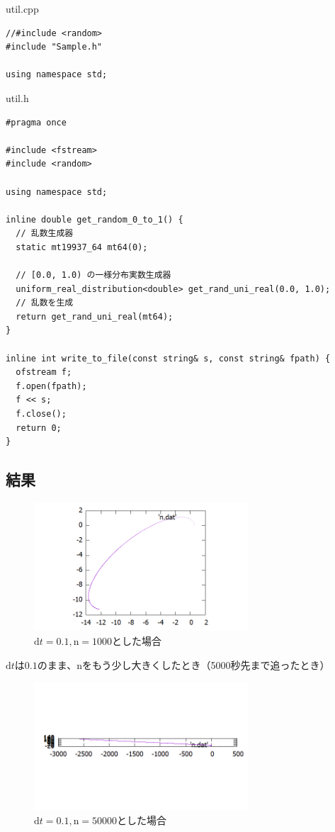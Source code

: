 \documentclass[a4paper,twoside]{jarticle}
\begin{document}
util.cpp
\begin{lstlisting}
//#include <random>
#include "Sample.h"

using namespace std;
\end{lstlisting}

util.h
\begin{lstlisting}
#pragma once

#include <fstream>
#include <random>

using namespace std;

inline double get_random_0_to_1() {
  // 乱数生成器
  static mt19937_64 mt64(0);

  // [0.0, 1.0) の一様分布実数生成器
  uniform_real_distribution<double> get_rand_uni_real(0.0, 1.0);
  // 乱数を生成
  return get_rand_uni_real(mt64);
}

inline int write_to_file(const string& s, const string& fpath) {
  ofstream f;
  f.open(fpath);
  f << s;
  f.close();
  return 0;
}
\end{lstlisting}

\subsection{結果}

\begin{figure}[H]
\begin{center}
\includegraphics[width=8cm]{../cpp/out/euler/euler_dt=e-1_n=1000.png}
\end{center}
\caption{$\mathrm{d}t=0.1, \mathrm{n}=1000$とした場合}
\end{figure}

$\mathrm{d}t$は$0.1$のまま、nをもう少し大きくしたとき（5000秒先まで追ったとき）

\begin{figure}[H]
\begin{center}
\includegraphics[width=8cm]{../cpp/out/euler/euler_dt=e-1_n=50000.png}
\end{center}
\caption{$\mathrm{d}t=0.1, \mathrm{n}=50000$とした場合}
\end{figure}
\end{document}
